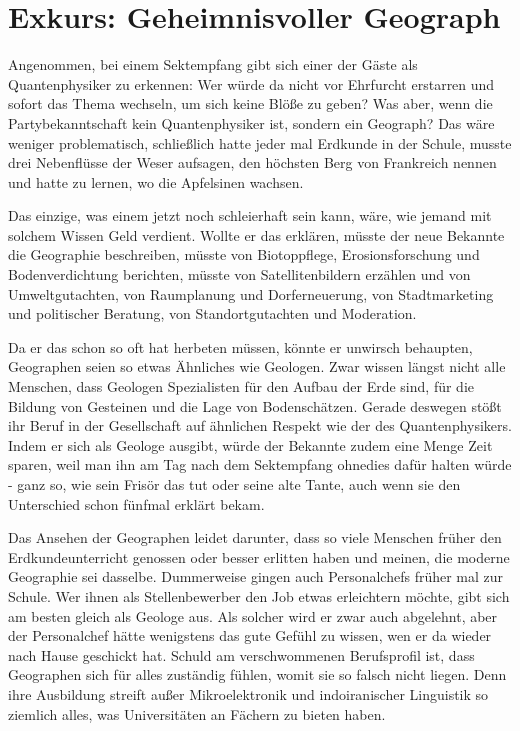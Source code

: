 \section*{Exkurs: Geheimnisvoller Geograph}
Angenommen, bei einem Sektempfang gibt sich einer der Gäste als Quantenphysiker zu erkennen: Wer würde da nicht vor Ehrfurcht erstarren und sofort das Thema wechseln, um sich keine Blöße zu geben? Was aber, wenn die Partybekanntschaft kein Quantenphysiker ist, sondern ein Geograph? Das wäre weniger problematisch, schließlich hatte jeder mal Erdkunde in der Schule, musste drei Nebenﬂüsse der Weser aufsagen, den höchsten Berg von Frankreich nennen und hatte zu lernen, wo die Apfelsinen wachsen.

Das einzige, was einem jetzt noch schleierhaft sein kann, wäre, wie jemand mit solchem Wissen Geld verdient. Wollte er das erklären, müsste der neue Bekannte die Geographie beschreiben, müsste von Biotoppﬂege, Erosionsforschung und Bodenverdichtung berichten, müsste von Satellitenbildern erzählen und von Umweltgutachten, von Raumplanung und Dorferneuerung, von Stadtmarketing und politischer Beratung, von Standortgutachten und Moderation.

Da er das schon so oft hat herbeten müssen, könnte er unwirsch behaupten, Geographen seien so etwas Ähnliches wie Geologen. Zwar wissen längst nicht alle Menschen, dass Geologen Spezialisten für den Aufbau der Erde sind, für die Bildung von Gesteinen und die Lage von Bodenschätzen. Gerade deswegen stößt ihr Beruf in der Gesellschaft auf ähnlichen Respekt wie der des Quantenphysikers. Indem er sich als Geologe ausgibt, würde der Bekannte zudem eine Menge Zeit sparen, weil man ihn am Tag nach dem Sektempfang ohnedies dafür halten würde - ganz so, wie sein Frisör das tut oder seine alte Tante, auch wenn sie den Unterschied schon fünfmal erklärt bekam.

Das Ansehen der Geographen leidet darunter, dass so viele Menschen früher den Erdkundeunterricht genossen oder besser erlitten haben und meinen, die moderne Geographie sei dasselbe. Dummerweise gingen auch Personalchefs früher mal zur Schule. Wer ihnen als Stellenbewerber den Job etwas erleichtern möchte, gibt sich am besten gleich als Geologe aus. Als solcher wird er zwar auch abgelehnt, aber der Personalchef hätte wenigstens das gute Gefühl zu wissen, wen er da wieder nach Hause geschickt hat. Schuld am verschwommenen Berufsproﬁl ist, dass Geographen sich für alles zuständig fühlen, womit sie so falsch nicht liegen. Denn ihre Ausbildung streift außer Mikroelektronik und indoiranischer Linguistik so ziemlich alles, was Universitäten an Fächern zu bieten haben.

